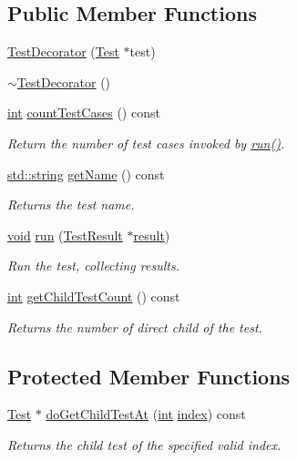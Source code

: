 \subsection*{Public Member Functions}
\begin{DoxyCompactItemize}
\item 
\hyperlink{class_test_decorator_a227e67c84146b23a37b44c24877b45d9}{Test\-Decorator} (\hyperlink{class_test}{Test} $\ast$test)
\item 
\hyperlink{class_test_decorator_a91a5d50dce7e822430154c2193dcaf7e}{$\sim$\-Test\-Decorator} ()
\item 
\hyperlink{wglew_8h_a500a82aecba06f4550f6849b8099ca21}{int} \hyperlink{class_test_decorator_add3b489dfb3331eba0aee7e06b03548b}{count\-Test\-Cases} () const 
\begin{DoxyCompactList}\small\item\em Return the number of test cases invoked by \hyperlink{class_test_decorator_a64dd70aae76f31f2e2f7b5ac84a8e829}{run()}. \end{DoxyCompactList}\item 
\hyperlink{glew_8h_ae84541b4f3d8e1ea24ec0f466a8c568b}{std\-::string} \hyperlink{class_test_decorator_acdcf679bba926032d2e4535fca1e9cf0}{get\-Name} () const 
\begin{DoxyCompactList}\small\item\em Returns the test name. \end{DoxyCompactList}\item 
\hyperlink{wglew_8h_aeea6e3dfae3acf232096f57d2d57f084}{void} \hyperlink{class_test_decorator_a64dd70aae76f31f2e2f7b5ac84a8e829}{run} (\hyperlink{class_test_result}{Test\-Result} $\ast$\hyperlink{glew_8h_a5fb5836a37f7607602a16ad733ed6357}{result})
\begin{DoxyCompactList}\small\item\em Run the test, collecting results. \end{DoxyCompactList}\item 
\hyperlink{wglew_8h_a500a82aecba06f4550f6849b8099ca21}{int} \hyperlink{class_test_decorator_aa2fbf0467c6bd599f912415a097e087c}{get\-Child\-Test\-Count} () const 
\begin{DoxyCompactList}\small\item\em Returns the number of direct child of the test. \end{DoxyCompactList}\end{DoxyCompactItemize}
\subsection*{Protected Member Functions}
\begin{DoxyCompactItemize}
\item 
\hyperlink{class_test}{Test} $\ast$ \hyperlink{class_test_decorator_a029da80376365525d52387a88e6837f4}{do\-Get\-Child\-Test\-At} (\hyperlink{wglew_8h_a500a82aecba06f4550f6849b8099ca21}{int} \hyperlink{fmod__codec_8h_a57f14e05b1900f16a2da82ade47d0c6d}{index}) const 
\begin{DoxyCompactList}\small\item\em Returns the child test of the specified valid index. \end{DoxyCompactList}\end{DoxyCompactItemize}
